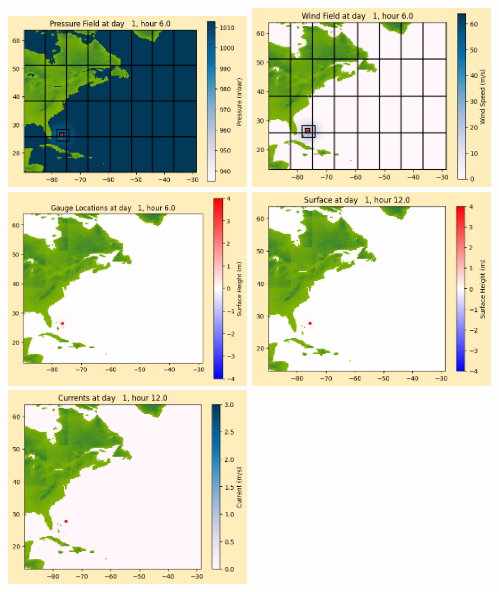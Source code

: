\documentclass[11pt]{article}
\begin{document}
\includegraphics[width=0.475\textwidth]{frame0017fig1012.png}
\vskip 10pt 
\includegraphics[width=0.475\textwidth]{frame0017fig1013.png}
\includegraphics[width=0.475\textwidth]{frame0017fig1014.png}
\vskip 10pt 
\includegraphics[width=0.475\textwidth]{frame0018fig1001.png}
\includegraphics[width=0.475\textwidth]{frame0018fig1002.png}
\end{document}
